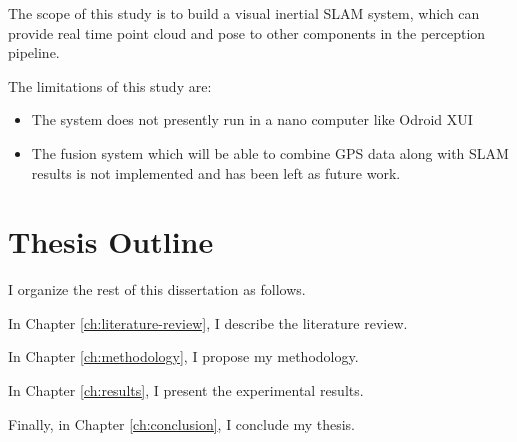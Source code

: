 The scope of this study is to build a visual inertial SLAM system, which can provide real time point cloud and pose to other components in the perception pipeline.

The limitations of this study are:

\begin{itemize}
	\item The system does not presently run in a nano computer like Odroid XUI 
	\item The fusion system which will be able to combine GPS data along with SLAM results is not implemented and has been left as future work.
\end{itemize}

\section{Thesis Outline}

I organize the rest of this dissertation as follows.

In Chapter \ref{ch:literature-review}, I describe the literature review.

In Chapter \ref{ch:methodology}, I propose my methodology.

In Chapter \ref{ch:results}, I present the experimental results.

Finally, in Chapter \ref{ch:conclusion}, I conclude my thesis.

\FloatBarrier
